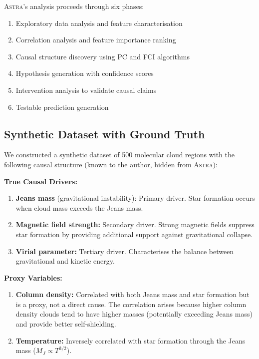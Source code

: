 \documentclass[usenatbib]{rasti}
\newcommand{\astra}{\textsc{Astra}\xspace}
\newcommand{\pc}{PC\xspace}
\newcommand{\fci}{FCI\xspace}
\begin{document}
\astra's analysis proceeds through six phases:
\begin{enumerate}
  \item[(i)] Exploratory data analysis and feature characterisation
  \item[(ii)] Correlation analysis and feature importance ranking
  \item[(iii)] Causal structure discovery using \pc and \fci algorithms
  \item[(iv)] Hypothesis generation with confidence scores
  \item[(v)] Intervention analysis to validate causal claims
  \item[(vi)] Testable prediction generation
\end{enumerate}

\subsection{Synthetic Dataset with Ground Truth}
\label{sec:tc6:dataset}

We constructed a synthetic dataset of 500 molecular cloud regions with the following causal structure (known to the author, hidden from \astra):

\textbf{True Causal Drivers:}
\begin{enumerate}
  \item[(i)] \textbf{Jeans mass} (gravitational instability): Primary driver. Star formation occurs when cloud mass exceeds the Jeans mass.
  \item[(ii)] \textbf{Magnetic field strength:} Secondary driver. Strong magnetic fields suppress star formation by providing additional support against gravitational collapse.
  \item[(iii)] \textbf{Virial parameter:} Tertiary driver. Characterises the balance between gravitational and kinetic energy.
\end{enumerate}

\textbf{Proxy Variables:}
\begin{enumerate}
  \item[(i)] \textbf{Column density:} Correlated with both Jeans mass and star formation but is a proxy, not a direct cause. The correlation arises because higher column density clouds tend to have higher masses (potentially exceeding Jeans mass) and provide better self-shielding.
  \item[(ii)] \textbf{Temperature:} Inversely correlated with star formation through the Jeans mass ($M_J \propto T^{3/2}$).
\end{enumerate}
\end{document}
